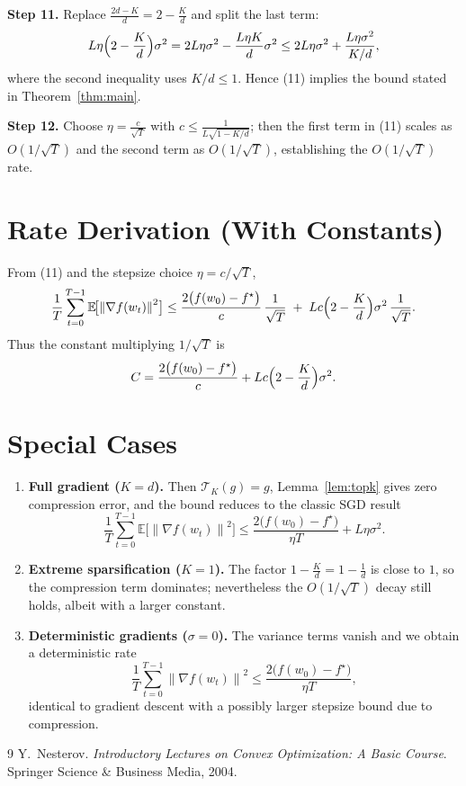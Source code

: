 \documentclass{article}
\newcommand{\E}{\mathbb{E}}
\newcommand{\norm}[1]{\left\|#1\right\|}
\newcommand{\topk}[1]{\mathcal{T}_K\!\left(#1\right)}
\begin{document}
\noindent\textbf{Step 11.} Replace $\frac{2d-K}{d}=2-\frac{K}{d}$ and split the last term:
\[
L\eta\Bigl(2-\frac{K}{d}\Bigr)\sigma^{2}
=2L\eta\sigma^{2}
   -\frac{L\eta K}{d}\sigma^{2}
\le 2L\eta\sigma^{2}
   +\frac{L\eta\sigma^{2}}{K/d},
\]
where the second inequality uses $K/d\le 1$.  Hence (11) implies the bound stated in Theorem~\ref{thm:main}.

\noindent\textbf{Step 12.} Choose $\eta = \frac{c}{\sqrt{T}}$ with $c\le \frac{1}{L\sqrt{1-K/d}}$; then the first term in (11) scales as $O(1/\sqrt{T})$ and the second term as $O(1/\sqrt{T})$, establishing the $O(1/\sqrt{T})$ rate. \hfill\qedsymbol

\section*{Rate Derivation (With Constants)}
From (11) and the stepsize choice $\eta=c/\sqrt{T}$,
\[
\frac{1}{T}\sum_{t=0}^{T-1}\E\!\bigl[\norm{\nabla f(w_t)}^{2}\bigr]
\le
\frac{2\bigl(f(w_0)-f^\star\bigr)}{c}\,\frac{1}{\sqrt{T}}
\;+\;
L c\Bigl(2-\frac{K}{d}\Bigr)\sigma^{2}\,\frac{1}{\sqrt{T}}.
\]
Thus the constant multiplying $1/\sqrt{T}$ is
\[
C = \frac{2\bigl(f(w_0)-f^\star\bigr)}{c}
     + Lc\Bigl(2-\frac{K}{d}\Bigr)\sigma^{2}.
\]

\section*{Special Cases}
\begin{enumerate}
\item \textbf{Full gradient ($K=d$).}  Then $\topk{g}=g$, Lemma~\ref{lem:topk} gives zero compression error, and the bound reduces to the classic SGD result
\[
\frac{1}{T}\sum_{t=0}^{T-1}\E\!\bigl[\norm{\nabla f(w_t)}^{2}\bigr]
\le\frac{2\bigl(f(w_0)-f^\star\bigr)}{\eta T}+L\eta\sigma^{2}.
\]

\item \textbf{Extreme sparsification ($K=1$).}  The factor $1-\frac{K}{d}=1-\frac{1}{d}$ is close to $1$, so the compression term dominates; nevertheless the $O(1/\sqrt{T})$ decay still holds, albeit with a larger constant.

\item \textbf{Deterministic gradients ($\sigma=0$).}  The variance terms vanish and we obtain a deterministic rate
\[
\frac{1}{T}\sum_{t=0}^{T-1}\norm{\nabla f(w_t)}^{2}
\le\frac{2\bigl(f(w_0)-f^\star\bigr)}{\eta T},
\]
identical to gradient descent with a possibly larger stepsize bound due to compression.
\end{enumerate}

\begin{thebibliography}{9}
Y.~Nesterov.
\newblock \emph{Introductory Lectures on Convex Optimization: A Basic Course}.
\newblock Springer Science \& Business Media, 2004.
\end{thebibliography}
\end{document}
